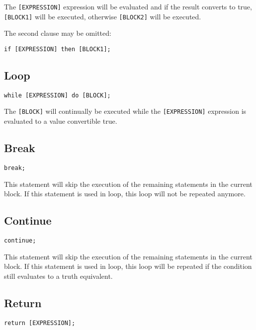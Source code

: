 \documentclass[a4paper,11pt,openany]{article}
\begin{document}
The \texttt{[EXPRESSION]} expression will be evaluated and if the result converts to true, \texttt{[BLOCK1]} will be executed, otherwise \texttt{[BLOCK2]} will be executed.

The second clause may be omitted: 

\begin{lstlisting}[frame=none]
if [EXPRESSION] then [BLOCK1];
\end{lstlisting}

\subsection{Loop}

\begin{lstlisting}[frame=none]
while [EXPRESSION] do [BLOCK];
\end{lstlisting}

The \texttt{[BLOCK]} will continually be executed while the \texttt{[EXPRESSION]} expression is evaluated to a value convertible true.

\subsection{Break}

\begin{lstlisting}[frame=none]
break;\end{lstlisting}


This statement will skip the execution of the remaining statements in the current block. If this statement is used in loop, this loop will not be repeated anymore.

\subsection{Continue}

\begin{lstlisting}[frame=none]
continue;\end{lstlisting}

This statement will skip the execution of the remaining statements in the current block. If this statement is used in loop, this loop will be repeated if the condition still evaluates to a truth equivalent.

\subsection{Return}

\begin{lstlisting}[frame=none]
return [EXPRESSION];\end{lstlisting}
\end{document}
